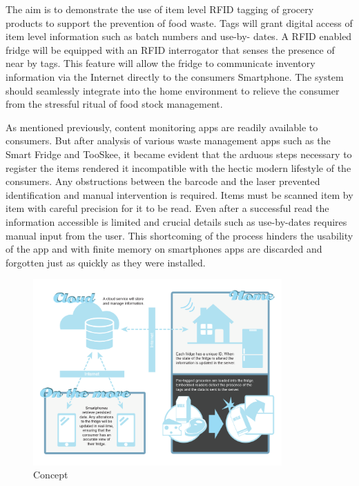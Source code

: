 \documentclass[a4paper, 11pt]{article}
\begin{document}
The aim is to demonstrate the use of item level RFID tagging of grocery products to support the prevention of food waste. Tags will grant digital access of item level information such as batch numbers and use-by- dates. A RFID enabled fridge will be equipped with an RFID interrogator that senses the presence of near by tags. This feature will allow the fridge to communicate inventory information via the Internet directly to the consumers Smartphone. The system should seamlessly integrate into the home environment to relieve the consumer from the stressful ritual of food stock management.

As mentioned previously, content monitoring apps are readily available to consumers. But after analysis of various waste management apps such as the Smart Fridge and TooSkee, it became evident that the arduous steps necessary to register the items rendered it incompatible with the hectic modern lifestyle of the consumers. Any obstructions between the barcode and the laser prevented identification and manual intervention is required. Items must be scanned item by item with careful precision for it to be read. Even after a successful read the information accessible is limited and crucial details such as use-by-dates requires manual input from the user. This shortcoming of the process hinders the usability of the app and with finite memory on smartphones apps are discarded and forgotten just as quickly as they were installed.

\begin{figure}[h!]
  \centering
    \includegraphics[width=0.85\textwidth]{system2.png}
      \caption{Concept}
\end{figure}
\end{document}

